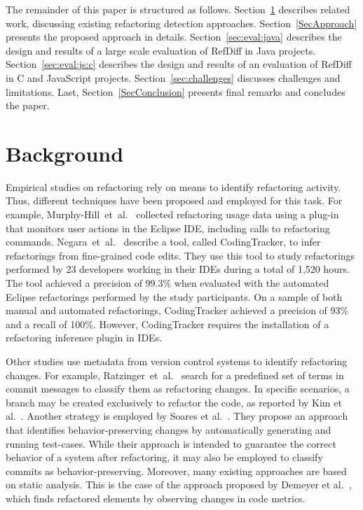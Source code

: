 \documentclass[10pt,journal,compsoc]{IEEEtran}
\begin{document}
The remainder of this paper is structured as follows.
Section~\ref{SecBackground} describes related work, discussing existing refactoring detection approaches.
Section~\ref{SecApproach} presents the proposed approach in details.
Section~\ref{sec:eval:java} describes the design and results of a large scale evaluation of RefDiff in Java projects.
Section~\ref{sec:eval:js:c} describes the design and results of an evaluation of RefDiff in C and JavaScript projects.
Section~\ref{sec:challenges} discusses challenges and limitations.
Last, Section~\ref{SecConclusion} presents final remarks and concludes the paper.




\section{Background}
\label{SecBackground}

Empirical studies on refactoring rely on means to identify refactoring activity. Thus, different techniques have been proposed and employed for this task.
For example, Murphy-Hill~et~al.~\cite{MurphyHill2012} collected refactoring usage data using a plug-in that monitors user actions in the Eclipse IDE, including calls to refactoring commands.
Negara~et~al.~\cite{negara2013} describe a tool, called CodingTracker, to infer refactorings from fine-grained code edits. They use this tool to study refactorings performed by 23 developers working in their IDEs during a total of 1,520 hours. The tool achieved a precision of 99.3\% when evaluated with the automated Eclipse refactorings performed by the study participants.
On a sample of both manual and automated refactorings, CodingTracker achieved a precision of 93\% and a recall of 100\%.
However, CodingTracker requires the installation of a refactoring inference plugin in IDEs.

Other studies use metadata from version control systems to identify refactoring changes. For example, Ratzinger~et~al.~\cite{ratzinger2008relation} search for a predefined set of terms in commit messages to classify them as refactoring changes. In specific scenarios, a branch may be created exclusively to refactor the code, as reported by Kim et al.~\cite{kim-tse-2014}.
Another strategy is employed by Soares et al.~\cite{soares2010making}. They propose an approach that identifies behavior-preserving changes by automatically generating and running test-cases. While their approach is intended to guarantee the correct behavior of a system after refactoring, it may also be employed to classify commits as behavior-preserving.
Moreover, many existing approaches are based on static analysis.
This is the case of the approach proposed by Demeyer et al.~\cite{demeyer2000finding}, which finds refactored elements by observing changes in code metrics.
\end{document}
